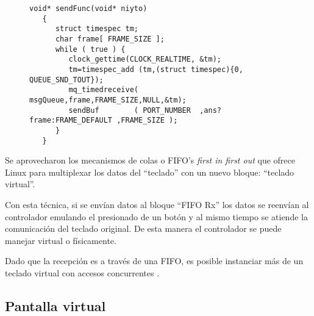 \begin{figure}[!h]
   \begin{lstlisting}[label={cod:handheld3},caption={Tarea de multiplexado de los datos del teclado físico y virtual.}]
   void* sendFunc(void* niyto)
   {
      struct timespec tm;
      char frame[ FRAME_SIZE ];
      while ( true ) {
         clock_gettime(CLOCK_REALTIME, &tm);
         tm=timespec_add (tm,(struct timespec){0, QUEUE_SND_TOUT});
         mq_timedreceive( msgQueue,frame,FRAME_SIZE,NULL,&tm);
         sendBuf        ( PORT_NUMBER  ,ans?frame:FRAME_DEFAULT ,FRAME_SIZE );
      }
   }
   \end{lstlisting}
\end{figure}

   Se aprovecharon los mecanismos de colas o FIFO's \textit{first in first out} que ofrece Linux para multiplexar los datos del ``teclado'' con un nuevo bloque: ``teclado virtual''.\par
      Con esta técnica, si se envían datos al bloque ``FIFO Rx'' los datos se reenvían al controlador emulando el presionado de un botón y al mismo tiempo se atiende la comunicación del teclado original.
      De esta manera el controlador se puede manejar virtual o físicamente.\par
      Dado que la recepción es a través de una FIFO, es posible instanciar más de un teclado virtual con accesos concurrentes \citep{book:embeddedprimer}.

\subsection{Pantalla virtual}

